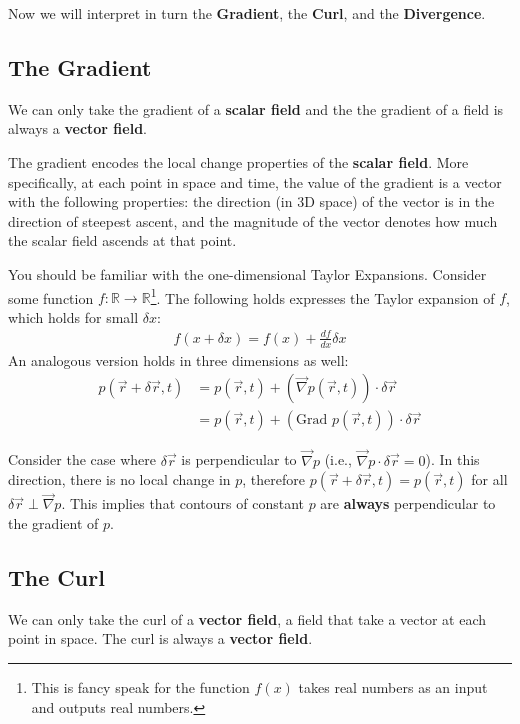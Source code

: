 Now we will interpret in turn the \textbf{Gradient}, the \textbf{Curl}, and the \textbf{Divergence}.

\subsection{The Gradient}

We can only take the gradient of a \textbf{scalar field} and the the gradient of a field is always a \textbf{vector field}.

The gradient encodes the local change properties of the \textbf{scalar field}. More specifically, at each point in space and time, the value of the gradient is a vector with the following properties: the direction (in 3D space) of the vector is in the direction of steepest ascent, and the magnitude of the vector denotes how much the scalar field ascends at that point.

You should be familiar with the one-dimensional Taylor Expansions. Consider some function $f: \mathbb{R} \to \mathbb{R}$\footnote{This is fancy speak for the function $f(x)$ takes real numbers as an input and outputs real numbers.}. The following holds expresses the Taylor expansion of $f$, which holds for small $\delta x$:
\begin{align*}
    f(x+\delta x)=f(x)+\frac{df}{dx}\delta x
\end{align*}
An analogous version holds in three dimensions as well:
\begin{align*}
    p(\vec{r}+\delta\vec{r},t)&=p(\vec{r},t)+\left( \vec{\nabla}p(\vec{r},t) \right)\cdot \delta\vec{r}\\
    &=p(\vec{r},t)+\left( \text{Grad }p(\vec{r},t) \right)\cdot \delta\vec{r}
\end{align*}

Consider the case where $\delta \vec{r}$ is perpendicular to $\vec{\nabla}p$ (i.e., $\vec{\nabla}p\cdot \delta \vec{r}=0$). In this direction, there is no local change in $p$, therefore $p(\vec{r}+\delta\vec{r},t)=p(\vec{r},t)$ for all $\delta\vec{r}\perp \vec{\nabla}p$. This implies that contours of constant $p$ are \textbf{always} perpendicular to the gradient of $p$. 

\subsection{The Curl}

We can only take the curl of a \textbf{vector field}, a field that take a vector at each point in space. The curl is always a \textbf{vector field}.

